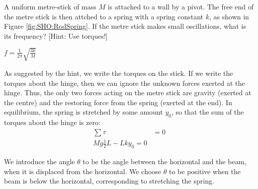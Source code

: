 \question A uniform metre-stick of mass $M$ is attached to a wall by a pivot. The free end of the metre stick is then attched to a spring with a spring constant $k$, as shown in Figure \ref{fig:SHO:RodSpring}. If the metre stick makes small oscillations, what is its frequency? [Hint: Use torques!] 
\begin{finalanswer}
$f=\frac{1}{2\pi}\sqrt{\frac{3k}{M}}$
\end{finalanswer}
\begin{solution}
As suggested by the hint, we write the torques on the stick. If we write the torques about the hinge, then we can ignore the unknown forces exerted at the hinge. Thus, the only two forces acting on the metre stick are gravity (exerted at the centre) and the restoring force from the spring (exerted at the end). In equilibrium, the spring is stretched by some amount $y_0$, so that the sum of the torques about the hinge is zero:
\begin{align*}
\sum \tau &= 0\\
Mg\frac{1}{2}L-Lky_0=0
\end{align*} 

We introduce the angle $\theta$ to be the angle between the horizontal and the beam, when it is displaced from the horizontal. We choose $\theta$ to be positive when the beam is below the horizontal, corresponding to stretching the spring.


\end{solution}
